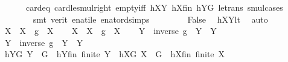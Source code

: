 \begin{isabellebody}
\ \ \ \ \ \ card{\isacharunderscore}{\kern0pt}{}{\isacharunderscore}{\kern0pt}eq\ card{\isacharunderscore}{\kern0pt}le{\isacharunderscore}{\kern0pt}smul{\isacharunderscore}{\kern0pt}right\ empty{\isacharunderscore}{\kern0pt}iff\ hXY\ hXfin\ hYG\ le{\isacharunderscore}{\kern0pt}trans\ smul{\isachardot}{\kern0pt}cases\isanewline
\ \ \ \ \ \ \isamarkupfalse%
\ {\isacharparenleft}{\kern0pt}smt\ {\isacharparenleft}{\kern0pt}verit{\isacharparenright}{\kern0pt}\ enat{\isacharunderscore}{\kern0pt}ile\ enat{\isacharunderscore}{\kern0pt}ord{\isacharunderscore}{\kern0pt}simps{\isacharparenleft}{\kern0pt}{}{\isacharparenright}{\kern0pt}{\isacharparenright}{\kern0pt}\ \isanewline
\ \ \ \ \isamarkupfalse%
\ \isamarkupfalse%
\ False\ \isamarkupfalse%
\ hXYlt\ \isamarkupfalse%
\ auto\isanewline
\ \ \isamarkupfalse%
\isanewline
\ \ \isamarkupfalse%
\ {\isacharquery}{\kern0pt}X{}\ {\isacharequal}{\kern0pt}\ {\isachardoublequoteopen}{\isacharparenleft}{\kern0pt}X\ {\isasymcdots}\ {\isacharbraceleft}{\kern0pt}g{\isacharbraceright}{\kern0pt}{\isacharparenright}{\kern0pt}\ {\isasyminter}\ X{\isachardoublequoteclose}\isanewline
\ \ \isamarkupfalse%
\ {\isacharquery}{\kern0pt}X{}\ {\isacharequal}{\kern0pt}\ {\isachardoublequoteopen}{\isacharparenleft}{\kern0pt}X\ {\isasymcdots}\ {\isacharbraceleft}{\kern0pt}g{\isacharbraceright}{\kern0pt}{\isacharparenright}{\kern0pt}\ {\isasymunion}\ X{\isachardoublequoteclose}\isanewline
\ \ \isamarkupfalse%
\ {\isacharquery}{\kern0pt}Y{}\ {\isacharequal}{\kern0pt}\ {\isachardoublequoteopen}{\isacharparenleft}{\kern0pt}{\isacharbraceleft}{\kern0pt}inverse\ g{\isacharbraceright}{\kern0pt}\ {\isasymcdots}\ Y{\isacharparenright}{\kern0pt}\ {\isasymunion}\ Y{\isachardoublequoteclose}\isanewline
\ \ \isamarkupfalse%
\ {\isacharquery}{\kern0pt}Y{}\ {\isacharequal}{\kern0pt}\ {\isachardoublequoteopen}{\isacharparenleft}{\kern0pt}{\isacharbraceleft}{\kern0pt}inverse\ g{\isacharbraceright}{\kern0pt}\ {\isasymcdots}\ Y{\isacharparenright}{\kern0pt}\ {\isasyminter}\ Y{\isachardoublequoteclose}\isanewline
\ \ \isamarkupfalse%
\ hY{}G{\isacharcolon}{\kern0pt}\ {\isachardoublequoteopen}{\isacharquery}{\kern0pt}Y{}\ {\isasymsubseteq}\ G{\isachardoublequoteclose}\ \ hY{}fin{\isacharcolon}{\kern0pt}\ {\isachardoublequoteopen}finite\ {\isacharquery}{\kern0pt}Y{}{\isachardoublequoteclose}\ \ hX{}G{\isacharcolon}{\kern0pt}\ {\isachardoublequoteopen}{\isacharquery}{\kern0pt}X{}\ {\isasymsubseteq}\ G{\isachardoublequoteclose}\ \ hX{}fin{\isacharcolon}{\kern0pt}\ {\isachardoublequoteopen}finite\ {\isacharquery}{\kern0pt}X{}{\isachardoublequoteclose}\ \isanewline

\end{isabellebody}
